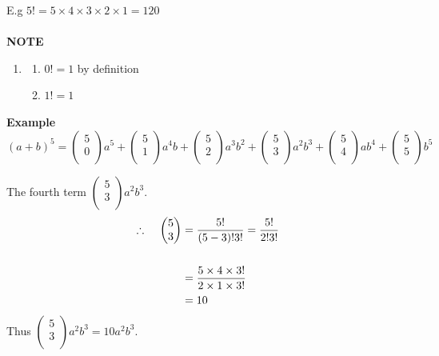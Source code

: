 \documentclass[11pt,a4paper]{article}
\begin{document}
E.g $5!=5\times 4\times 3\times 2\times 1 = 120$\\\\


\textbf{NOTE} 
\begin{enumerate}
\item[]
\begin{enumerate}
      \item[] $0!=1$ by definition
      \item[] $1!=1$
\end{enumerate}
\end{enumerate}

\textbf{Example}
$$(a+b)^5=
\begin{pmatrix}
5\\0\\
\end{pmatrix}
a^5+
\begin{pmatrix}
5\\1\\
\end{pmatrix}
a^4b+
\begin{pmatrix}
5\\2\\
\end{pmatrix}
a^3b^2+
\begin{pmatrix}
5\\3\\
\end{pmatrix}
a^2b^3+
\begin{pmatrix}
5\\4\\
\end{pmatrix}
ab^4+
\begin{pmatrix}
5\\5\\
\end{pmatrix}
b^5
$$


The fourth term $
\begin{pmatrix}
5\\3\\
\end{pmatrix}
a^2b^3
$.
\begin{align*}
\therefore\hspace{0.4cm} 
\begin{pmatrix}
5\\3\\
\end{pmatrix}
 &= \frac{5!}{(5-3)!3!}=\frac{5!}{2!3!}\\\\
 & = \frac{5\times 4\times 3!}{2\times 1\times 3!}\\
 & = 10
\end{align*}
Thus $
\begin{pmatrix}
5\\3\\
\end{pmatrix}
a^2b^3=10a^2b^3
$.\\\\
\end{document}
